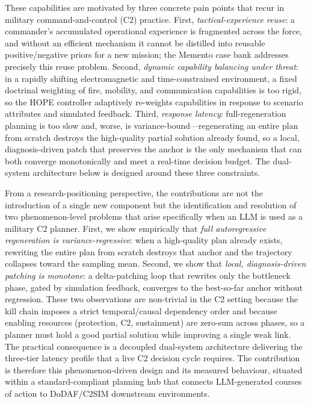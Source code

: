 These capabilities are motivated by three concrete pain points that recur in military command-and-control (C2) practice. First, \emph{tactical-experience reuse}: a commander's accumulated operational experience is fragmented across the force, and without an efficient mechanism it cannot be distilled into reusable positive/negative priors for a new mission; the Memento case bank addresses precisely this reuse problem. Second, \emph{dynamic capability balancing under threat}: in a rapidly shifting electromagnetic and time-constrained environment, a fixed doctrinal weighting of fire, mobility, and communication capabilities is too rigid, so the HOPE controller adaptively re-weights capabilities in response to scenario attributes and simulated feedback. Third, \emph{response latency}: full-regeneration planning is too slow and, worse, is variance-bound---regenerating an entire plan from scratch destroys the high-quality partial solution already found, so a local, diagnosis-driven patch that preserves the anchor is the only mechanism that can both converge monotonically and meet a real-time decision budget. The dual-system architecture below is designed around these three constraints.

From a research-positioning perspective, the contributions are not the introduction of a single new component but the identification and resolution of two phenomenon-level problems that arise specifically when an LLM is used as a military C2 planner. First, we show empirically that \emph{full autoregressive regeneration is variance-regressive}: when a high-quality plan already exists, rewriting the entire plan from scratch destroys that anchor and the trajectory collapses toward the sampling mean. Second, we show that \emph{local, diagnosis-driven patching is monotone}: a delta-patching loop that rewrites only the bottleneck phase, gated by simulation feedback, converges to the best-so-far anchor without regression. These two observations are non-trivial in the C2 setting because the kill chain imposes a strict temporal/causal dependency order and because enabling resources (protection, C2, sustainment) are zero-sum across phases, so a planner must hold a good partial solution while improving a single weak link. The practical consequence is a decoupled dual-system architecture delivering the three-tier latency profile that a live C2 decision cycle requires. The contribution is therefore this phenomenon-driven design and its measured behaviour, situated within a standard-compliant planning hub that connects LLM-generated courses of action to DoDAF/C2SIM downstream environments.

